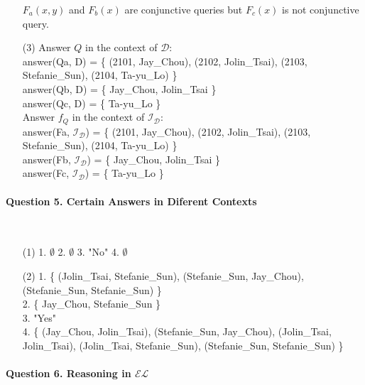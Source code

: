 \documentclass[12pt]{article}
\def \I {\mathcal{I}}
\begin{document}
\begin{enumerate}
$F_a(x, y)$ and $F_b(x)$ are conjunctive queries but $F_c(x)$ is not conjunctive query.
        \item [(3)]
        Answer $Q$ in the context of $\mathcal{D}$: \\
answer(Qa, D) = \{ (2101, Jay\_Chou), (2102, Jolin\_Tsai), (2103, Stefanie\_Sun), (2104, Ta-yu\_Lo) \} \\
answer(Qb, D) = \{ Jay\_Chou, Jolin\_Tsai \} \\
answer(Qc, D) = \{ Ta-yu\_Lo \} \\
Answer $f_Q$ in the context of $\I_\mathcal{D}$: \\
answer(Fa, $\I_\mathcal{D}$) = \{ (2101, Jay\_Chou), (2102, Jolin\_Tsai), (2103, Stefanie\_Sun), (2104, Ta-yu\_Lo) \} \\
answer(Fb, $\I_\mathcal{D}$) = \{ Jay\_Chou, Jolin\_Tsai \} \\
answer(Fc, $\I_\mathcal{D}$) = \{ Ta-yu\_Lo \}
    \end{enumerate}

    \newpage
    \paragraph{Question 5. Certain Answers in Diferent Contexts}~{}
    \\
    \begin{enumerate}
        \item [(1)]
        1. $\emptyset$  2. $\emptyset$  3. "No"  4. $\emptyset$
        \item [(2)]
        1. \{ (Jolin\_Tsai, Stefanie\_Sun), (Stefanie\_Sun, Jay\_Chou), (Stefanie\_Sun, Stefanie\_Sun) \} \\
        2. \{ Jay\_Chou, Stefanie\_Sun \} \\
        3. "Yes" \\
        4. \{ (Jay\_Chou, Jolin\_Tsai), (Stefanie\_Sun, Jay\_Chou), (Jolin\_Tsai, Jolin\_Tsai), (Jolin\_Tsai, Stefanie\_Sun), (Stefanie\_Sun, Stefanie\_Sun) \}
    \end{enumerate}

    \newpage
    \paragraph{Question 6. Reasoning in $\mathcal{EL}$}~{}
    \\
\end{document}
